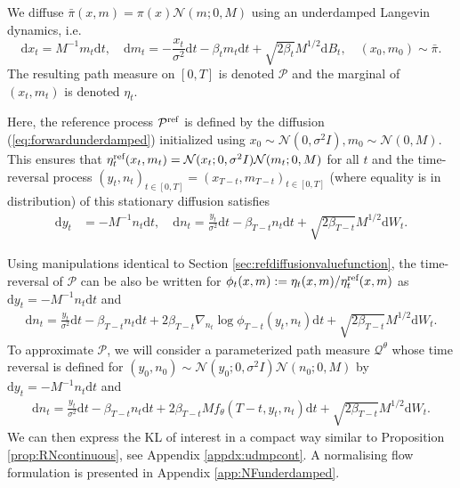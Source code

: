 \documentclass{article} %
\begin{document}
We diffuse $\bar{\pi}(x,m)=\pi(x)\mathcal{N}(m;0,M)$ using an underdamped Langevin dynamics, i.e.
\begin{equation}\label{eq:forwardunderdamped}
\mathrm{d}x_t=M^{-1}m_t\mathrm{d}t,\quad \mathrm{d}m_t=-\frac{x_t}{\sigma^2}\mathrm{d}t -\beta_t m_t\mathrm{d}t +\sqrt{2\beta_t}M^{1/2}\mathrm{d}B_t,\quad (x_0,m_0)\sim \bar{\pi}.
\end{equation}
The resulting path measure on $[0,T]$ is denoted $\mathcal{P}$ and the marginal of $(x_t,m_t)$ is denoted $\eta_t$.

Here, the reference process $\mathcal{P}^{\textup{ref}}$ is defined by the diffusion (\ref{eq:forwardunderdamped}) initialized using $x_0 \sim \mathcal{N}(0,\sigma^2 I), m_0\sim \mathcal{N}(0,M)$. This ensures that $\eta^{\textup{ref}}_t(x_t,m_t)=\mathcal{N}(x_t;0,\sigma^2I)\mathcal{N}(m_t;0,M)$ for all $t$ and the time-reversal process $(y_t,n_t)_{t\in[0,T]}=(x_{T-t},m_{T-t})_{t\in[0,T]}$ (where equality is in distribution) of this stationary diffusion satisfies
\begin{align}\label{eq:reverseunderdampedref}
\mathrm{d}y_t&=-M^{-1}n_t\mathrm{d}t,\quad
\mathrm{d}n_t
=\frac{y_t}{\sigma^2}\mathrm{d}t -\beta_{T-t} n_t\mathrm{d}t+\sqrt{2\beta_{T-t}}M^{1/2}\mathrm{d}W_t. 
\end{align}

Using manipulations identical to Section \ref{sec:refdiffusionvaluefunction}, the time-reversal of $\mathcal{P}$ can be also be written for $\phi_t(x,m):=\eta_t(x,m)/\eta_t^{\textup{ref}}(x,m)$ as $\mathrm{d}y_t=-M^{-1}n_t\mathrm{d}t$ and
\begin{align}\label{eq:reverseunderdampedphi}
\mathrm{d}n_t=
\frac{y_t}{\sigma^2}\mathrm{d}t - \beta_{T-t}n_t\mathrm{d}t +2\beta_{T-t}\nabla_{n_t} \log \phi_{T-t}(y_t,n_t)\mathrm{d}t+\sqrt{2\beta_{T-t}}M^{1/2}\mathrm{d}W_t. %
\end{align}
To approximate $\mathcal{P}$, we will consider a parameterized path measure $\mathcal{Q}^\theta$ whose time reversal is defined for $(y_0,n_0)\sim \mathcal{N}(y_0;0,\sigma^2 I)\mathcal{N}(n_0;0,M)$ by $\mathrm{d}y_t=-M^{-1}n_t\mathrm{d}t$ and 
\begin{align}\label{eq:reverseunderdampedQ}
\mathrm{d}n_t=\frac{y_t}{\sigma^2}\mathrm{d}t - \beta_{T-t} n_t\mathrm{d}t +2\beta_{T-t}M f_{\theta}(T-t,y_t,n_t)\mathrm{d}t+\sqrt{2\beta_{T-t}}M^{1/2}\mathrm{d}W_t.
\end{align}
We can then express the KL of interest in a compact way similar to Proposition \ref{prop:RNcontinuous}, see Appendix \ref{appdx:udmpcont}. A normalising flow formulation is presented in Appendix \ref{app:NFunderdamped}.
\end{document}
